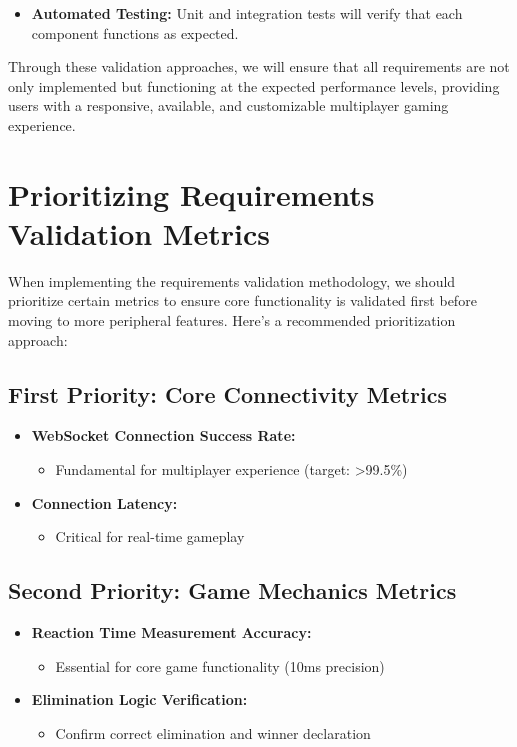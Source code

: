 \documentclass[]{VUMIFTemplateClass}
\begin{document}
\begin{itemize} \item \textbf{Automated Testing:} Unit and integration tests will verify that each component functions as expected.

\end{itemize}

Through these validation approaches, we will ensure that all requirements are not only implemented but functioning at the expected performance levels, providing users with a responsive, available, and customizable multiplayer gaming experience.


\section{Prioritizing Requirements Validation Metrics}

When implementing the requirements validation methodology, we should prioritize certain metrics to ensure core functionality is validated first before moving to more peripheral features. Here's a recommended prioritization approach:

\subsection{First Priority: Core Connectivity Metrics}
\begin{itemize}
\item 	\textbf{WebSocket Connection Success Rate:}
\begin{itemize}
\item Fundamental for multiplayer experience (target: >99.5\%)
\end{itemize}
\item 	\textbf{Connection Latency:}
\begin{itemize}
\item Critical for real-time gameplay
\end{itemize}
\end{itemize}

\subsection{Second Priority: Game Mechanics Metrics}
\begin{itemize}
\item 	\textbf{Reaction Time Measurement Accuracy:}
\begin{itemize}
\item Essential for core game functionality (10ms precision)
\end{itemize}
\item 	\textbf{Elimination Logic Verification:}
\begin{itemize}
\item Confirm correct elimination and winner declaration
\end{itemize}
\end{itemize}
\end{document}
